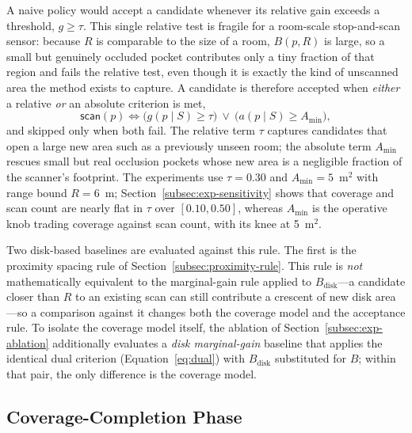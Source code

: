 A naive policy would accept a candidate whenever its relative gain exceeds a
threshold, $g\ge\tau$. This single relative test is fragile for a
room-scale stop-and-scan sensor: because $R$ is comparable to the size of a
room, $B(p,R)$ is large, so a small but genuinely occluded pocket
contributes only a tiny fraction of that region and fails the relative test,
even though it is exactly the kind of unscanned area the method exists to
capture. A candidate is therefore accepted when \emph{either} a relative
\emph{or} an absolute criterion is met,
\begin{equation}
\textsf{scan}(p)\iff
\big(g(p\mid S)\ge\tau\big)\ \lor\ \big(a(p\mid S)\ge A_{\min}\big),
\label{eq:dual}
\end{equation}
and skipped only when both fail. The relative term $\tau$ captures candidates
that open a large new area such as a previously unseen room; the absolute term
$A_{\min}$ rescues small but real occlusion pockets whose new area is a
negligible fraction of the scanner's footprint. The experiments use
$\tau=0.30$ and $A_{\min}=5$~m$^2$ with range bound $R=6$~m;
Section~\ref{subsec:exp-sensitivity} shows that coverage and scan count are
nearly flat in $\tau$ over $[0.10,0.50]$, whereas $A_{\min}$ is the operative
knob trading coverage against scan count, with its knee at 5~m$^2$.

Two disk-based baselines are evaluated against this rule. The first is the
proximity spacing rule of Section~\ref{subsec:proximity-rule}. This rule is
\emph{not} mathematically equivalent to the marginal-gain rule applied to
$B_{\mathrm{disk}}$---a candidate closer than $R$ to an existing scan can still
contribute a crescent of new disk area---so a comparison against it changes
both the coverage model and the acceptance rule. To isolate the coverage model
itself, the ablation of Section~\ref{subsec:exp-ablation} additionally
evaluates a \emph{disk marginal-gain} baseline that applies the identical dual
criterion (Equation~\ref{eq:dual}) with $B_{\mathrm{disk}}$ substituted for
$B$; within that pair, the only difference is the coverage model.

\subsection{Coverage-Completion Phase}
\label{subsec:completion}

